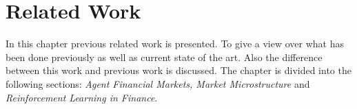 \documentclass{kththesis}
\theoremstyle{definition}
\begin{document}



\chapter{Related Work}
In this chapter previous related work is presented. To give a view over what has been done previously as well as current state of the art. Also the difference between this work and previous work is discussed. The chapter is divided into the following sections: \textit{Agent Financial Markets, Market Microstructure} and \textit{Reinforcement Learning in Finance}.
\end{document}
